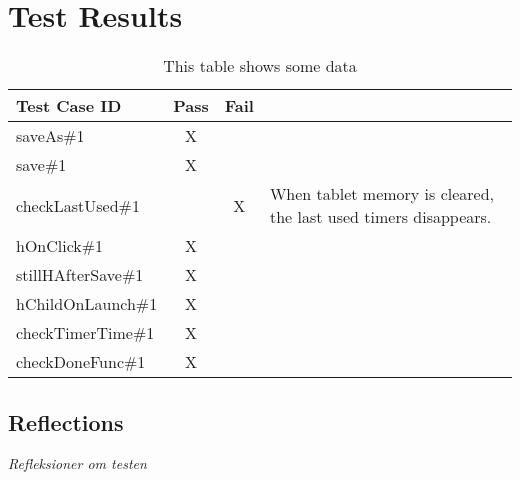 \section{Test Results}
	
	\begin{table}[width=\textwidth]
		\begin{center}
			\begin{tabular}{|l|c|c|p{6cm}|}
				\hline
				\textbf{Test Case ID} & \textbf{Pass} & \textbf{Fail} & \textbf{} \\
				\hline
				saveAs\#1 & X &  &  \\
				\hline
				save\#1 & X &  &  \\
				\hline
				checkLastUsed\#1 &  & X & When tablet memory is cleared, the last used timers disappears. \\
				\hline
				hOnClick\#1 & X &  &  \\
				\hline
				stillHAfterSave\#1 & X &  &  \\
				\hline
				hChildOnLaunch\#1 & X &  &  \\
				\hline
				checkTimerTime\#1 & X &  &  \\
				\hline
				checkDoneFunc\#1 & X &  &  \\
				\hline
			\end{tabular}
			\caption{This table shows some data}
			\label{tab:myfirsttable}
		\end{center}
	\end{table}

\subsection{Reflections}
\textit{Refleksioner om testen}